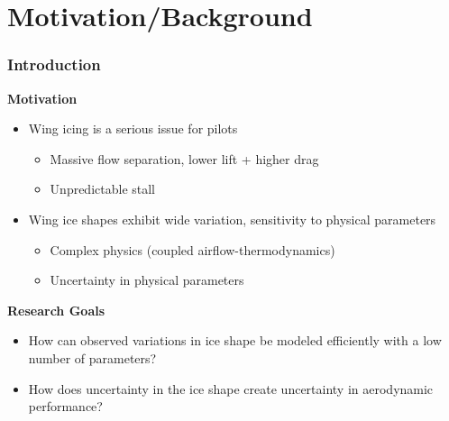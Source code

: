 \documentclass[9pt]{beamer}
\begin{document}
\section{Motivation/Background}
\label{sec-1}
\begin{frame}
\frametitle{Introduction}
\label{sec-1-1}

\textbf{Motivation}
\begin{itemize}
\item Wing icing is a serious issue for pilots
\begin{itemize}
\item Massive flow separation, lower lift + higher drag
\item Unpredictable stall
\end{itemize}
\item Wing ice shapes exhibit wide variation, sensitivity to physical
  parameters
\begin{itemize}
\item Complex physics (coupled airflow-thermodynamics)
\item Uncertainty in physical parameters
\end{itemize}
\end{itemize}
\textbf{Research Goals}
\begin{itemize}
\item How can observed variations in ice shape be modeled
  efficiently with a low number of parameters?
\item How does uncertainty in the ice shape create uncertainty in
  aerodynamic performance?
\end{itemize}
\end{frame}
\end{document}
